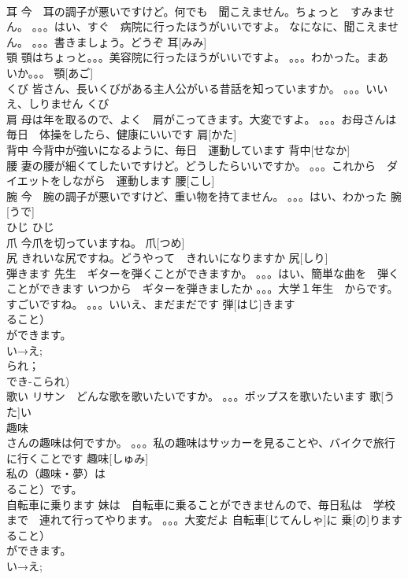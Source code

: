 \documentclass[8pt]{extreport}
\begin{document}
\begin{CJK}{UTF8}{min}
\\	耳	今　耳の調子が悪いですけど。何でも　聞こえません。ちょっと　すみません。 。。。はい、すぐ　病院に行ったほうがいいですよ。 なになに、聞こえません。 。。。書きましょう。どうぞ	耳[みみ]			
\\	顎	顎はちょっと。。。美容院に行ったほうがいいですよ。 。。。わかった。まあ　いか。。。	顎[あご]			
\\	くび	皆さん、長いくびがある主人公がいる昔話を知っていますか。 。。。いいえ、しりません	くび			
\\	肩	母は年を取るので、よく　肩がこってきます。大変ですよ。 。。。お母さんは　毎日　体操をしたら、健康にいいです	肩[かた]			
\\	背中	今背中が強いになるように、毎日　運動しています	背中[せなか]			
\\	腰	妻の腰が細くてしたいですけど。どうしたらいいですか。 。。。これから　ダイエットをしながら　運動します	腰[こし]			
\\	腕	今　腕の調子が悪いですけど、重い物を持てません。 。。。はい、わかった	腕[うで]			
\\	ひじ		ひじ			
\\	爪	今爪を切っていますね。	爪[つめ]			
\\	尻	きれいな尻ですね。どうやって　きれいになりますか	尻[しり]			
\\	弾きます	先生　ギターを弾くことができますか。 。。。はい、簡単な曲を　弾くことができます いつから　ギターを弾きましたか 。。。大学１年生　からです。 すごいですね。 。。。いいえ、まだまだです	弾[はじ]きます			
\\	ること）　
\\	ができます。
\\	い→え;
\\	られ；
\\	でき-こられ)	
\\	歌い	リサン　どんな歌を歌いたいですか。 。。。ポップスを歌いたいます	歌[うた]い			
\\	趣味	
\\	さんの趣味は何ですか。 。。。私の趣味はサッカーを見ることや、バイクで旅行に行くことです	趣味[しゅみ]			
\\	私の（趣味・夢）は　
\\	ること）です。
\\	自転車に乗ります	妹は　自転車に乗ることができませんので、毎日私は　学校まで　連れて行ってやります。 。。。大変だよ	自転車[じてんしゃ]に 乗[の]ります			
\\	ること）　
\\	ができます。
\\	い→え;

\end{CJK}
\end{document}
